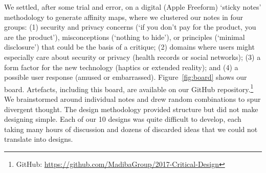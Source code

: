 We settled, after some trial and error, on a digital (Apple Freeform) `sticky notes' methodology to generate affinity maps, where we clustered our notes in four groups: (1) security and privacy concerns (\eg `if you don't pay for the product, you are the product'), misconceptions (\eg `nothing to hide'), or principles (\eg `minimal disclosure')  that could be the basis of a critique; (2) domains where users might especially care about security or privacy (\eg health records or social networks); (3) a form factor for the new technology (\eg haptics or extended reality); and (4) a possible user response (\eg amused or embarrassed). Figure~\ref{fig:board} shows our board. Artefacts, including this board, are available on our GitHub repository.\footnote{GitHub: \url{https://github.com/MadibaGroup/2017-Critical-Design}} We brainstormed around individual notes and drew random combinations to spur divergent thought. The design methodology provided structure but did not make designing simple. Each of our 10 designs was quite difficult to develop, each taking many hours of discussion and dozens of discarded ideas that we could not translate into designs. 


